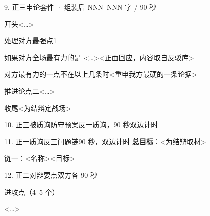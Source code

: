 \documentclass[script,pro]{debate}   %
\begin{document}
\begin{kit}{9. 正三申论}{套件 · 组装后 NNN–NNN 字 / 90 秒}
\begin{fixed}{开头}<…>\end{fixed}
\begin{pick}{处理对方最强点}{1}
\begin{module}{如果对方全场最有力的是 <…>}<正面回应，内容取自反驳库>\end{module}
\begin{fallback}{对方最有力的一点不在以上几条时}<重申我方最硬的一条论据>\end{fallback}
\end{pick}
\begin{fixed}{推进论点二}<…>\end{fixed}
\begin{fixed}{收尾}<为结辩定战场>\end{fixed}
\end{kit}

\begin{stage}{10. 正三被质询防守预案}{反一质询，90 秒双边计时}
\begin{qa}
\end{qa}
\end{stage}

\begin{stage}{11. 正一质询反三问题链}{90 秒，双边计时}
\textbf{总目标}：<为结辩取材>
\begin{chain}{链一：<名称>}{<目标>}
\end{chain}
\end{stage}

\begin{stage}{12. 正二对辩要点}{双方各 90 秒}
\begin{points}{进攻点（4–5 个）}
\item <…>
\end{points}
\end{stage}
\end{document}
